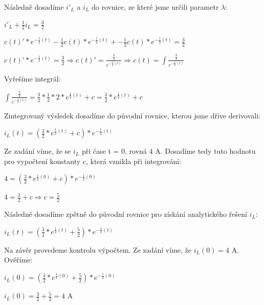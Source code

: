 \documentclass[12pt]{article}
\begin{document}
\begin{center}
\normalsize Následně dosadíme $i'_L$ a $i_L$ do rovnice, ze které jsme určili parametr $\lambda$:
\vspace{10px}

\Large $i'_L + \frac{1}{2}i_L = \frac{3}{2}$\\
\vspace{10px}

$c(t)' * e^{-\frac{1}{2}(t)} - \frac{1}{2} c(t) * e^{-\frac{1}{2}(t)} + - \frac{1}{2} c(t) * e^{-\frac{1}{2}(t)} = \frac{3}{2}$\\
\vspace{10px}

$c(t)' * e^{-\frac{1}{2}(t)} = \frac{3}{2} \Rightarrow c(t)' = \frac{\frac{3}{2}}{e^{-\frac{1}{2}(t)}} \Rightarrow c(t) = \int \frac{\frac{3}{2}}{e^{-\frac{1}{2}(t)}}$\\
\vspace{10px}

\normalsize Vyřešíme integrál:\\
\vspace{10px}

\Large
$\int \frac{\frac{3}{2}}{e^{-\frac{1}{2}(t)}} = \frac{3}{2} * \frac{1}{2} * 2 * e^{\frac{1}{2}(t)} + c = \frac{3}{2} * e^{\frac{1}{2}(t)} + c$\\
\vspace{10px}

\normalsize Zintegrovaný výsledek dosadíme do původní rovnice, kterou jsme dříve derivovali:
\vspace{10px}

\Large
$i_L(t) = (\frac{3}{2} * e^{\frac{1}{2}(t)} + c) * e^{-\frac{1}{2}(t)}$
\vspace{10px}

\normalsize Ze zadání víme, že se $i_L$ při čase t = 0, rovná 4 A. Dosadíme tedy tuto hodnotu pro vypočtení konstanty c, která vznikla při integrování:
\vspace{10px}

\Large
$4 = (\frac{3}{2} * e^{\frac{1}{2}(0)} + c) * e^{-\frac{1}{2}(0)}$
\vspace{10px}

$4 = \frac{3}{2} + c \Rightarrow c = \frac{5}{2}$
\vspace{10px}

\normalsize Následně dosadíme zpětně do původní rovnice pro získání analytického řešení $i_L$:
\vspace{10px}

\Large $i_L(t) = (\frac{3}{2} * e^{\frac{1}{2}(t)} + \frac{5}{2}) * e^{-\frac{1}{2}(t)}$
\vspace{10px}

\normalsize Na závěr provedeme kontrolu výpočtem. Ze zadání víme, že $i_L(0) = 4$ A. Ověříme:\\
\vspace{10px}

\Large $i_L(0) = (\frac{3}{2} * e^{\frac{1}{2}(0)} + \frac{5}{2}) * e^{-\frac{1}{2}(0)}$
\vspace{10px}

$i_L(0) = \frac{3}{2} + \frac{5}{2} = 4$ A
\end{center}
\clearpage
\end{document}
